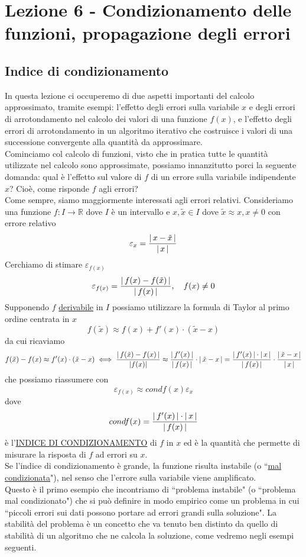\section{Lezione 6 - Condizionamento delle funzioni, propagazione degli errori}
\subsection{Indice di condizionamento}
In questa lezione ci occuperemo di due aspetti importanti del calcolo approssimato, tramite esempi: l'effetto degli errori sulla variabile $x$ e degli errori di arrotondamento nel calcolo dei valori di una funzione $f(x)$, e l'effetto degli errori di arrotondamento in un algoritmo iterativo che costruisce i valori di una successione convergente alla quantità da approssimare.\\
Cominciamo col calcolo di funzioni, visto che in pratica tutte le quantità utilizzate nel calcolo sono approssimate, possiamo innanzitutto porci la seguente domanda: qual è l'effetto sul valore di $f$ di un errore sulla variabile indipendente $x$? Cioè, come risponde $f$ agli errori?\\
Come sempre, siamo maggiormente interessati agli errori relativi. Consideriamo una funzione $f: I \to \mathbb{R}$ dove $I$ è un intervallo e $x, \tilde{x} \in I$ dove $\tilde{x} \approx x, x \neq 0$ con errore relativo
\[\varepsilon_x = \frac{\lvert\,x-\tilde{x}\,\rvert}{\lvert\,x\,\rvert}\]
Cerchiamo di stimare $\varepsilon_{f(x)}$\\
\[ \varepsilon_{f(x)} = \frac{\lvert\,f(x)-f(\tilde{x})\,\rvert}{\lvert\,f(x)\,\rvert}, \quad f(x) \neq 0 \]
Supponendo $f$ \uline{derivabile} in $I$ possiamo utilizzare la formula
di Taylor al primo ordine centrata in $x$
\[ f(\tilde{x}) \approx f(x) + f'(x)\cdot (\tilde{x}-x) \]
da cui ricaviamo
\[ f(\tilde{x})-f(x) \approx f'(x)\cdot (\tilde{x}-x) \iff
        \frac{\lvert\,f(\tilde{x})-f(x)\,\rvert}{\lvert f(x)\rvert} \approx \frac{\lvert\,f'(x)\,\rvert}{\lvert\,f(x)\,\rvert} \cdot \lvert\,\tilde{x}-x\,\rvert = \frac{\lvert\,f'(x)\,\rvert \cdot \lvert\,x\,\rvert}{\lvert\,f(x)\,\rvert} \cdot \frac{\lvert\,\tilde{x}-x\,\rvert}{\lvert\,x\,\rvert} \]
che possiamo riassumere con \[\varepsilon_{f(x)} \approx condf(x) \varepsilon_x \] dove
\[ condf(x)=\frac{\lvert\,f'(x)\,\rvert \cdot \lvert\,x\,\rvert}{\lvert\,f(x)\,\rvert} \]
è l'\uline{INDICE DI CONDIZIONAMENTO} di $f$ in $x$ ed è la quantità che permette di misurare la risposta di $f$ ad errori su $x$.\\
Se l'indice di condizionamento è grande, la funzione risulta instabile (o ``\uline{mal condizionata}"), nel senso che l'errore sulla variabile viene amplificato.\\
Questo è il primo esempio che incontriamo di ``problema instabile" (o ``problema mal condizionato") che si può definire in modo empirico come un problema in cui ``piccoli errori sui dati possono portare ad errori grandi sulla soluzione".\newline \newline
La stabilità del problema è un concetto che va tenuto ben distinto da quello di stabilità di un algoritmo che ne calcola la soluzione, come vedremo negli esempi seguenti.
